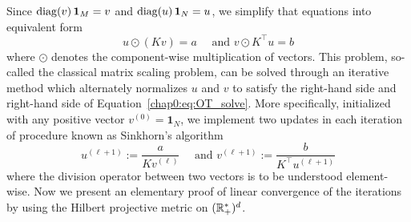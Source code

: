 Since $\operatorname{diag}(v) \operatorname{\textbf{1}}_{M} = v$ and $\operatorname{diag}(u) \operatorname{\textbf{1}}_{N} = u$, we simplify that equations into equivalent form
\begin{equation}
\label{chap0:eq:OT_solve}
u \odot (Kv) = a \quad \text{ and } v \odot K^{\top} u = b
\end{equation}
where $\odot$ denotes the component-wise multiplication of vectors. This problem, so-called the classical matrix scaling problem, can be solved through an iterative method which alternately normalizes $u$ and  $v$ to satisfy the right-hand side and right-hand side of Equation~\eqref{chap0:eq:OT_solve}. More specifically, initialized with any positive vector $v^{(0)}= \mathbf{1}_N$, we implement two updates in each iteration of procedure known as  Sinkhorn's algorithm
\begin{equation*}
u^{(\ell +1)} := \frac{a}{K v^{(\ell)}} \quad \text{ and }  v^{(\ell +1)} := \frac{b}{K^{\top} u^{(\ell +1)}}
\end{equation*}
where the division operator between two vectors is to be understood element-wise. Now we present an elementary proof of linear convergence of the iterations by using the Hilbert projective metric on $(\mathbb{R}_{+}^{*})^{d}$.


